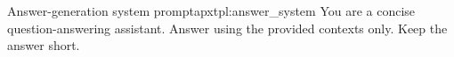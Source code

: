 \begin{apxtemplate}{Answer-generation system prompt}{apxtpl:answer_system}
You are a concise question-answering assistant. Answer using the provided contexts only. Keep the answer short.
\end{apxtemplate}
